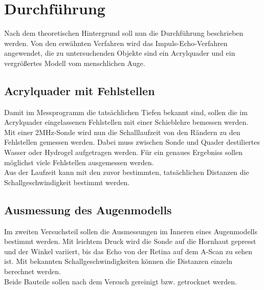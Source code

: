 \section{Durchführung}
\label{sec:Durchführung}

Nach dem theoretischen Hintergrund soll nun die Durchführung beschrieben werden. Von den erwähnten Verfahren wird
das Impuls-Echo-Verfahren angewendet, die zu untersuchenden Objekte sind ein Acrylquader und ein vergrößertes
Modell vom menschlichen Auge.

\subsection{Acrylquader mit Fehlstellen}
\label{sec:Acrylquader mit Fehlstellen}

Damit im Messprogramm die tatsächlichen Tiefen bekannt sind, sollen die im Acrylquader eingelassenen Fehlstellen
mit einer Schieblehre bemessen werden.
\\
Mit einer 2MHz-Sonde wird nun die Schalllaufzeit von den Rändern zu den Fehlstellen gemessen werden. Dabei muss
zwischen Sonde und Quader destiliertes Wasser oder Hydrogel aufgetragen werden. Für ein genaues Ergebniss sollen
möglichst viele Fehlstellen ausgemessen werden.
\\
Aus der Laufzeit kann mit den zuvor bestimmten, tatsächlichen Distanzen die Schallgeschwindigkeit bestimmt werden.

\subsection{Ausmessung des Augenmodells}
\label{sec:Ausmessung des Augenmodells}

Im zweiten Versuchsteil sollen die Ausmessungen im Inneren eines Augenmodells bestimmt werden. Mit leichtem Druck
wird die Sonde auf die Hornhaut gepresst und der Winkel variiert, bis das Echo von der Retina auf dem A-Scan zu
sehen ist. Mit bekannten Schallgeschwindigkeiten können die Distanzen einzeln berechnet werden.
\vspace{0.5cm}
\\
Beide Bauteile sollen nach dem Versuch gereinigt bzw. getrocknet werden.

